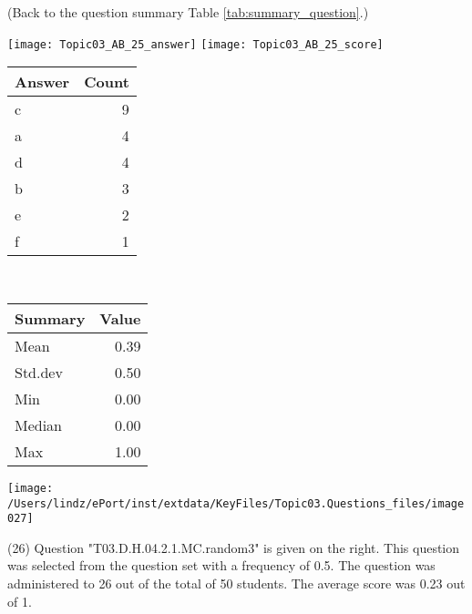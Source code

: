 \documentclass[12pt,english,nohyper]{tufte-handout}\usepackage[]{graphicx}\usepackage[]{color}
\begin{document}
 (Back to the question summary Table \ref{tab:summary_question}.)

\begin{center} \texttt{[image: Topic03\_AB\_25\_answer]} \texttt{[image: Topic03\_AB\_25\_score]} \end{center} 

\begin{center}%
\begin{tabular}{lr}
  \hline
Answer & Count \\ 
  \hline
c &   9 \\ 
  a &   4 \\ 
  d &   4 \\ 
  b &   3 \\ 
  e &   2 \\ 
  f &   1 \\ 
   \hline
\end{tabular}
~~~~~~~~%
\begin{tabular}{lr}
  \hline
Summary & Value \\ 
  \hline
Mean & 0.39 \\ 
  Std.dev & 0.50 \\ 
  Min & 0.00 \\ 
  Median & 0.00 \\ 
  Max & 1.00 \\ 
   \hline
\end{tabular}
\end{center}\newpage{}



\vspace{4cm}\begin{marginfigure}\texttt{[image: /Users/lindz/ePort/inst/extdata/KeyFiles/Topic03.Questions\_files/image027]}\end{marginfigure}\vspace{-4cm} (26) Question "T03.D.H.04.2.1.MC.random3" is given on the right. This question was selected from the question set with a frequency of 0.5. The question was administered to 26 out of the total of 50 students. The average score was 0.23 out of 1.
\end{document}
